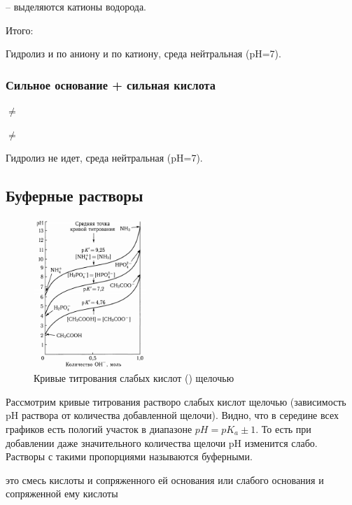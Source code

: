  -- выделяются катионы водорода.

Итого:


Гидролиз и по аниону и по катиону, среда нейтральная (pH=7).

\subsubsection{Сильное основание + сильная кислота}


 $\neq$

 $\neq$

Гидролиз не идет, среда нейтральная (pH=7).
 
 \subsection{Буферные растворы}
 
\begin{figure}
  \begin{center}
    \includegraphics[width=0.38\textwidth]{Pictures/17_bufcurve.png}
  \end{center}
  \caption{Кривые титрования слабых кислот () щелочью}
\end{figure}
 
 Рассмотрим кривые титрования растворо слабых кислот щелочью (зависимость pH раствора от количества добавленной щелочи). Видно, что в середине всех графиков есть пологий участок в диапазоне $pH = pK_a \pm 1$. То есть при добавлении даже значительного количества щелочи pH изменится слабо. Растворы с такими пропорциями называются буферными. 
 
  это смесь кислоты  и сопряженного ей основания  или  слабого основания  и сопряженной ему кислоты 
 
